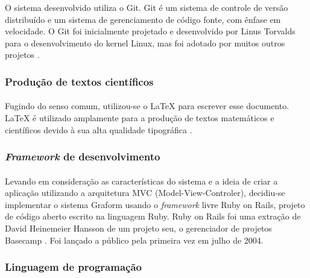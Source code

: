 \documentclass[11pt]{article}
\begin{document}
          O sistema desenvolvido utiliza o Git. Git é um sistema de 
          controle de versão distribuído e um sistema de gerenciamento 
          de código fonte, com ênfase em velocidade. O Git foi inicialmente 
          projetado e desenvolvido por Linus Torvalds para o desenvolvimento 
          do kernel Linux, mas foi adotado por muitos outros projetos \cite{website:git}.
          
        \subsubsection{Produção de textos científicos}

          \paragraph{}
          
          Fugindo do senso comum, utilizou-se o {\LaTeX} para escrever esse 
          documento. {\LaTeX} é utilizado amplamente 
          para a produção de textos matemáticos e científicos devido à 
          sua alta qualidade tipográfica \cite{website:latex}.
          
        \subsubsection{{\em Framework} de desenvolvimento}

          \paragraph{}
          
          Levando em consideração as características do sistema e a ideia de 
          criar a aplicação utilizando a arquitetura MVC (Model-View-Controler), 
          decidiu-se implementar o sistema Graform usando o {\em framework }
          livre Ruby on Rails, projeto  de código 
          aberto escrito na linguagem Ruby. Ruby on Rails foi uma 
          extração de David Heinemeier Hansson de um projeto seu, o 
          gerenciador de projetos Basecamp \cite{website:rails,urubatan,thomas}. 
          Foi lançado a público pela primeira vez em julho de 2004.
          
        \subsubsection{Linguagem de programação}
\end{document}

